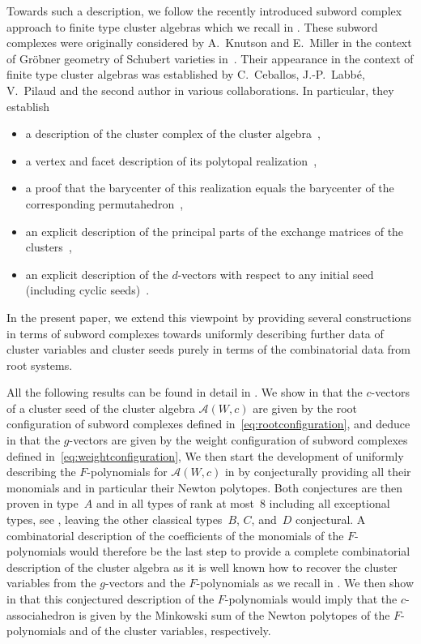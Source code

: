 \documentclass[ALCO,Unicode,ThmDefs]{cedram}
\newcommand{\Alg}{\mathcal{A}}
\begin{document}
Towards such a description, we follow the recently introduced subword complex approach to finite type cluster algebras which we recall in . These subword complexes were originally considered by A.~Knutson and E.~Miller in the context of Gr\"obner geometry of Schubert varieties in~\cite{KM2004,KM2005}. Their appearance in the context of finite type cluster algebras was established by C.~Ceballos, J.-P.~Labb\'e, V.~Pilaud and the second author in various collaborations. In particular, they establish
\begin{itemize}
\item a description of the cluster complex of the cluster algebra~\cite[Theorem~2.2]{CLS2014},
\item a vertex and facet description of its polytopal realization~\cite[Theorem~6.4]{PS2015},
\item a proof that the barycenter of this realization equals the barycenter of the corresponding permutahedron~\cite[Theorem~1.1]{PS20152},
\item an explicit description of the principal parts of the exchange matrices of the clusters~\cite[Theorem~6.20]{PS2015},
\item an explicit description of the $d$-vectors with respect to any initial seed (including cyclic seeds)~\cite[Corollary~3.4]{CP2015}.
\end{itemize}

In the present paper, we extend this viewpoint by providing several constructions in terms of subword complexes towards uniformly describing further data of cluster variables and cluster seeds purely in terms of the combinatorial data from root systems.


All the following results can be found in detail in . We show in  that the $c$-vectors of a cluster seed of the cluster algebra $\Alg(W,c)$ are given by the root configuration of subword complexes defined in~\eqref{eq:rootconfiguration}, and deduce in  that the $g$-vectors are given by the weight configuration of subword complexes defined in~\eqref{eq:weightconfiguration}, We then start the development of uniformly describing the $F$-polynomials for $\Alg(W,c)$ in  by conjecturally providing all their monomials and in particular their Newton polytopes. Both conjectures are then proven in type~$A$ and in all types of rank at most~$8$ including all exceptional types, see , leaving the other classical types~$B$, $C$, and~$D$ conjectural. A combinatorial description of the coefficients of the monomials of the $F$-polynomials would therefore be the last step to provide a complete combinatorial description of the cluster algebra as it is well known how to recover the cluster variables from the $g$-vectors and the $F$-polynomials as we recall in . We then show in  that this conjectured description of the $F$-polynomials would imply that the $c$-associahedron is given by the Minkowski sum of the Newton polytopes of the $F$-polynomials and of the cluster variables, respectively.
\end{document}
